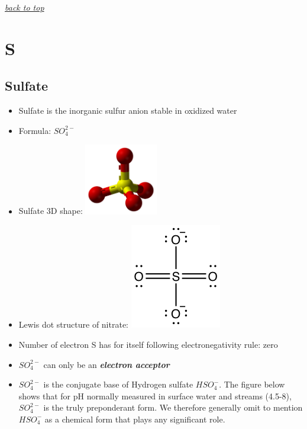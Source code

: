 \documentclass[]{book}
\providecommand{\tightlist}{%
  \setlength{\itemsep}{0pt}\setlength{\parskip}{0pt}}
\theoremstyle{definition}
\theoremstyle{definition}
\theoremstyle{definition}
\theoremstyle{remark}
\begin{document}
\emph{\protect\hyperlink{top}{back to top}}

\section{S}\label{s}

\subsection{Sulfate}\label{sulfate}

\begin{itemize}
\tightlist
\item
  Sulfate is the inorganic sulfur anion stable in oxidized water
\item
  Formula: \(SO_4^{2-}\)
\item
  Sulfate 3D shape:
  \includegraphics[width=0.25000\textwidth]{pictures/Sulfate-3D-balls.png}
\item
  Lewis dot structure of nitrate:
  \includegraphics{pictures/sulfate_lewis_structure.png}
\item
  Number of electron S has for itself following electronegativity rule:
  zero
\item
  \(SO_4^{2-}\) can only be an \emph{\textbf{electron acceptor}}
\item
  \(SO_4^{2-}\) is the conjugate base of Hydrogen sulfate \(HSO_4^{-}\).
  The figure below shows that for pH normally measured in surface water
  and streams (4.5-8), \(SO_4^{2-}\) is the truly preponderant form. We
  therefore generally omit to mention \(HSO_4^{-}\) as a chemical form
  that plays any significant role.
\end{itemize}
\end{document}
